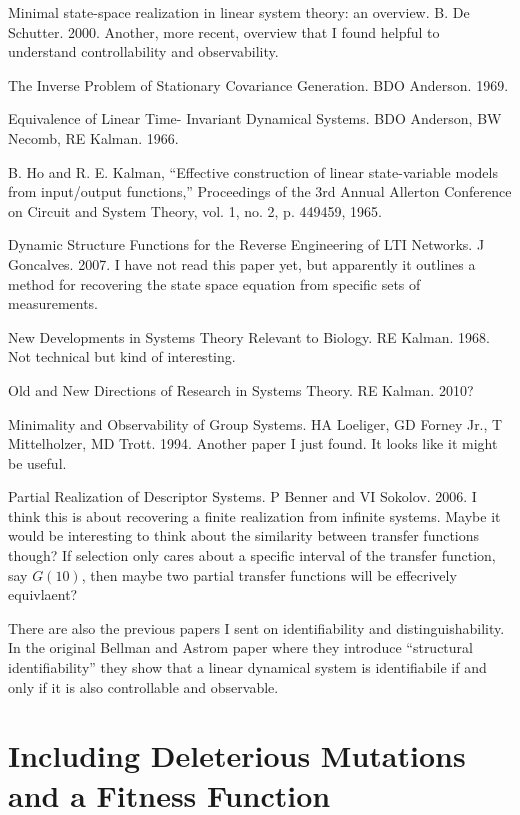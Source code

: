 \documentclass[11 pt]{article}
\begin{document}
Minimal state-space realization in linear system theory: an overview. B. De Schutter. 2000.
Another, more recent, overview that I found helpful to understand controllability and observability. 

The Inverse Problem of Stationary Covariance Generation. BDO Anderson. 1969.

Equivalence of Linear Time- Invariant Dynamical Systems. BDO Anderson, BW Necomb, RE Kalman. 1966. 

B. Ho and R. E. Kalman, “Effective construction of linear state-variable models from input/output functions,” Proceedings of the 3rd Annual Allerton Conference on Circuit and System Theory, vol. 1, no. 2, p. 449459, 1965.

Dynamic Structure Functions for the Reverse Engineering of LTI Networks. J Goncalves. 2007.
I have not read this paper yet, but apparently it outlines a method for recovering the state space equation from specific sets of measurements.

New Developments in Systems Theory Relevant to Biology. RE Kalman. 1968.
Not technical but kind of interesting. 

Old and New Directions of Research in Systems Theory. RE Kalman. 2010?

Minimality and Observability of Group Systems. HA Loeliger, GD Forney Jr., T Mittelholzer, MD Trott. 1994. 
Another paper I just found. It looks like it might be useful.

Partial Realization of Descriptor Systems. P Benner and VI Sokolov. 2006. 
I think this is about recovering a finite realization from infinite systems. Maybe it would be interesting to think about the similarity between transfer functions though? If selection only cares about a specific interval of the transfer function, say $G(10)$, then maybe two partial transfer functions will be effecrively equivlaent? 

There are also the previous papers I sent on identifiability and distinguishability. In the original Bellman and Astrom paper where they introduce ``structural identifiability'' they show that a linear dynamical system is identifiabile if and only if it is also controllable and observable. 

\section{Including Deleterious Mutations and a Fitness Function}\label{sec:del}
\end{document}
